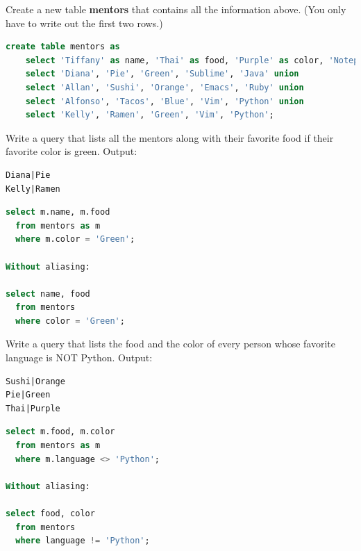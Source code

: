 \documentclass{exam}
\begin{document}
\begin{questions}
\question Create a new table \textbf{mentors} that contains all the information above.
(You only have to write out the first two rows.)
\begin{solution}
\begin{lstlisting}[language=SQL]
create table mentors as
    select 'Tiffany' as name, 'Thai' as food, 'Purple' as color, 'Notepad++' as editor, 'Java' as language union
    select 'Diana', 'Pie', 'Green', 'Sublime', 'Java' union
    select 'Allan', 'Sushi', 'Orange', 'Emacs', 'Ruby' union
    select 'Alfonso', 'Tacos', 'Blue', 'Vim', 'Python' union
    select 'Kelly', 'Ramen', 'Green', 'Vim', 'Python';
\end{lstlisting}
\end{solution}

\clearpage

\begin{blocksection}
\question Write a query that lists all the mentors along with their favorite food if their favorite color is green.\newline
Output:
\begin{lstlisting}
Diana|Pie
Kelly|Ramen
\end{lstlisting}
\begin{solution}[1in]
\begin{lstlisting}[language=SQL]
select m.name, m.food
  from mentors as m
  where m.color = 'Green';

Without aliasing:

select name, food
  from mentors
  where color = 'Green';
\end{lstlisting}
\end{solution}

\question Write a query that lists the food and the color of every person whose
favorite language is NOT Python. \newline
Output:
\begin{lstlisting}
Sushi|Orange
Pie|Green
Thai|Purple
\end{lstlisting}
\begin{solution}[1in]
\begin{lstlisting}[language=SQL]
select m.food, m.color
  from mentors as m
  where m.language <> 'Python';

Without aliasing:

select food, color
  from mentors
  where language != 'Python';
\end{lstlisting}
\end{solution}
\end{blocksection}


\end{questions}
\end{document}
